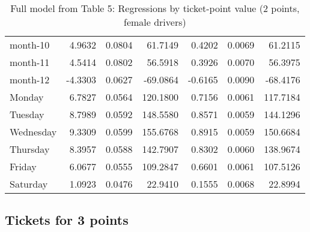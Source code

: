 \documentclass[10pt]{article}
\begin{document}
\begin{table}[ht]
\begin{tabular}{lrrrrrr}
  month-10 & 4.9632 & 0.0804 & 61.7149 & 0.4202 & 0.0069 & 61.2115 \\ 
  month-11 & 4.5414 & 0.0802 & 56.5918 & 0.3926 & 0.0070 & 56.3975 \\ 
  month-12 & -4.3303 & 0.0627 & -69.0864 & -0.6165 & 0.0090 & -68.4176 \\ 
  Monday & 6.7827 & 0.0564 & 120.1800 & 0.7156 & 0.0061 & 117.7184 \\ 
  Tuesday & 8.7989 & 0.0592 & 148.5580 & 0.8571 & 0.0059 & 144.1296 \\ 
  Wednesday & 9.3309 & 0.0599 & 155.6768 & 0.8915 & 0.0059 & 150.6684 \\ 
  Thursday & 8.3957 & 0.0588 & 142.7907 & 0.8302 & 0.0060 & 138.9674 \\ 
  Friday & 6.0677 & 0.0555 & 109.2847 & 0.6601 & 0.0061 & 107.5126 \\ 
  Saturday & 1.0923 & 0.0476 & 22.9410 & 0.1555 & 0.0068 & 22.8994 \\ 
   \hline
\end{tabular}
\caption{Full model from Table 5: Regressions by ticket-point value (2 points, female drivers)} 
\label{tab_5_2_pts_no_age_F}
\end{table}


\clearpage
\pagebreak




\subsection{Tickets for 3 points}



\end{document}
